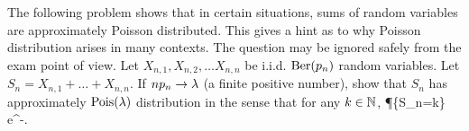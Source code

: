 \documentclass[preprint,  11pt]{amsart}
\begin{document}
\medskip
The following problem shows that in certain situations, sums of random variables are approximately Poisson distributed. This gives a hint as to why Poisson distribution arises in many contexts. The question may be ignored safely from the exam point of view.
{\color{red}
\bepr Let $X_{n,1},X_{n,2},\ldots X_{n,n}$ be i.i.d. $\mbox{Ber}(p_{n})$ random variables. Let $S_{n}=X_{n,1}+\ldots +X_{n,n}$.
 If $np_{n}\rightarrow \lambda$ (a finite positive number), show that $S_{n}$ has approximately $\mbox{Pois}(\lambda)$ distribution in the sense that for any $k\in \mathbb{N}$,
\ba
\P\{S_{n}=k\} \to e^{-\lam}.
\eepr
}



%
\end{document}

